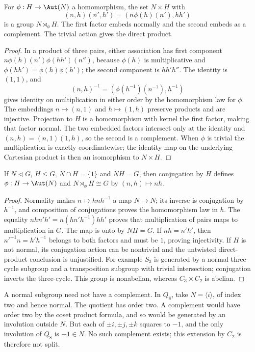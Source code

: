 \begin{theorem}\label{thm:semidirect-construction}
For $\phi:H\to\Aut(N)$ a homomorphism, the set $N\times H$ with
\[
 (n,h)(n',h')=(n\phi(h)(n'),hh')
\]
is a group $N\rtimes_\phi H$. The first factor embeds normally and the second embeds as a complement. The trivial action gives the direct product.
\end{theorem}
\begin{proof}
In a product of three pairs, either association has first component
$n\phi(h)(n')\phi(hh')(n'')$, because $\phi(h)$ is multiplicative and $\phi(hh')=\phi(h)\phi(h')$; the second component is $hh'h''$. The identity is $(1,1)$, and
\[
 (n,h)^{-1}=(\phi(h^{-1})(n^{-1}),h^{-1})
\]
gives identity on multiplication in either order by the homomorphism law for $\phi$. The embeddings $n\mapsto(n,1)$ and $h\mapsto(1,h)$ preserve products and are injective. Projection to $H$ is a homomorphism with kernel the first factor, making that factor normal. The two embedded factors intersect only at the identity and $(n,h)=(n,1)(1,h)$, so the second is a complement. When $\phi$ is trivial the multiplication is exactly coordinatewise; the identity map on the underlying Cartesian product is then an isomorphism to $N\times H$.
\end{proof}

\begin{theorem}\label{thm:semidirect-recognition}
If $N\mathrel{\triangleleft}G$, $H\leq G$, $N\cap H=\{1\}$ and $NH=G$, then conjugation by $H$ defines $\phi:H\to\Aut(N)$ and $N\rtimes_\phi H\cong G$ by $(n,h)\mapsto nh$.
\end{theorem}
\begin{proof}
Normality makes $n\mapsto hnh^{-1}$ a map $N\to N$; its inverse is conjugation by $h^{-1}$, and composition of conjugations proves the homomorphism law in $h$. The equality
$nhn'h'=n(hn'h^{-1})hh'$ proves that multiplication of pairs maps to multiplication in $G$. The map is onto by $NH=G$. If $nh=n'h'$, then $n'^{-1}n=h'h^{-1}$ belongs to both factors and must be $1$, proving injectivity. If $H$ is not normal, its conjugation action can be nontrivial and the untwisted direct-product conclusion is unjustified. For example $S_3$ is generated by a normal three-cycle subgroup and a transposition subgroup with trivial intersection; conjugation inverts the three-cycle. This group is nonabelian, whereas $C_3\times C_2$ is abelian.
\end{proof}

A normal subgroup need not have a complement. In $Q_8$, take $N=\langle i\rangle$, of index two and hence normal. The quotient has order two. A complement would have order two by the coset product formula, and so would be generated by an involution outside $N$. But each of $\pm i,\pm j,\pm k$ squares to $-1$, and the only involution of $Q_8$ is $-1\in N$. No such complement exists; this extension by $C_2$ is therefore not split.
